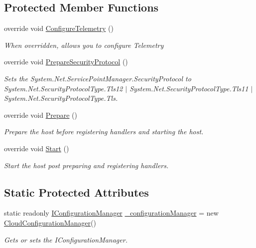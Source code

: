 \subsection*{Protected Member Functions}
\begin{DoxyCompactItemize}
\item 
override void \hyperlink{classCqrs_1_1Azure_1_1ConfigurationManager_1_1TelemetryCoreHost_abcb4e14f33f2b85b95a2b80c4555748a_abcb4e14f33f2b85b95a2b80c4555748a}{Configure\+Telemetry} ()
\begin{DoxyCompactList}\small\item\em When overridden, allows you to configure Telemetry \end{DoxyCompactList}\item 
override void \hyperlink{classCqrs_1_1Azure_1_1ConfigurationManager_1_1TelemetryCoreHost_a0e920d0139b12319847f8ec1deb12f3b_a0e920d0139b12319847f8ec1deb12f3b}{Prepare\+Security\+Protocol} ()
\begin{DoxyCompactList}\small\item\em Sets the System.\+Net.\+Service\+Point\+Manager.\+Security\+Protocol to System.\+Net.\+Security\+Protocol\+Type.\+Tls12 $\vert$ System.\+Net.\+Security\+Protocol\+Type.\+Tls11 $\vert$ System.\+Net.\+Security\+Protocol\+Type.\+Tls. \end{DoxyCompactList}\item 
override void \hyperlink{classCqrs_1_1Azure_1_1ConfigurationManager_1_1TelemetryCoreHost_a620cb9c1ceb78a8f23b45ae749199fd4_a620cb9c1ceb78a8f23b45ae749199fd4}{Prepare} ()
\begin{DoxyCompactList}\small\item\em Prepare the host before registering handlers and starting the host. \end{DoxyCompactList}\item 
override void \hyperlink{classCqrs_1_1Azure_1_1ConfigurationManager_1_1TelemetryCoreHost_a37c8e3f829743d6be1108b3fd8a5a3e7_a37c8e3f829743d6be1108b3fd8a5a3e7}{Start} ()
\begin{DoxyCompactList}\small\item\em Start the host post preparing and registering handlers. \end{DoxyCompactList}\end{DoxyCompactItemize}
\subsection*{Static Protected Attributes}
\begin{DoxyCompactItemize}
\item 
static readonly \hyperlink{interfaceCqrs_1_1Configuration_1_1IConfigurationManager}{I\+Configuration\+Manager} \hyperlink{classCqrs_1_1Azure_1_1ConfigurationManager_1_1TelemetryCoreHost_a17dab2f4d92bff926b54f9d58238de6b_a17dab2f4d92bff926b54f9d58238de6b}{\+\_\+configuration\+Manager} = new \hyperlink{classCqrs_1_1Azure_1_1ConfigurationManager_1_1CloudConfigurationManager}{Cloud\+Configuration\+Manager}()
\begin{DoxyCompactList}\small\item\em Gets or sets the I\+Configuration\+Manager. \end{DoxyCompactList}\end{DoxyCompactItemize}
